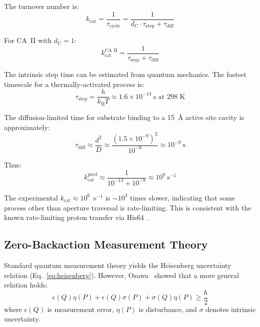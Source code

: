 \documentclass[twocolumn,amsmath,amssymb,aps,prb,superscriptaddress,longbibliography]{revtex4-2}
\newcommand{\dC}{d_{\mathrm{C}}}
\newcommand{\kcat}{k_{\mathrm{cat}}}
\newcommand{\kB}{k_{\mathrm{B}}}
\begin{document}
The turnover number is:
\begin{equation}
\kcat = \frac{1}{\tau_{\text{cycle}}} = \frac{1}{\dC \cdot \tau_{\text{step}} + \tau_{\text{diff}}}
\label{eq:kcat-full}
\end{equation}

For CA~II with $\dC = 1$:
\begin{equation}
\kcat^{\text{CA II}} = \frac{1}{\tau_{\text{step}} + \tau_{\text{diff}}}
\end{equation}

The intrinsic step time can be estimated from quantum mechanics. The fastest timescale for a thermally-activated process is:
\begin{equation}
\tau_{\text{step}} = \frac{h}{\kB T} \approx 1.6 \times 10^{-13}~\text{s at 298 K}
\label{eq:tau-step}
\end{equation}

The diffusion-limited time for substrate binding to a 15~\AA{} active site cavity is approximately:
\begin{equation}
\tau_{\text{diff}} \approx \frac{d^2}{D} \approx \frac{(1.5 \times 10^{-9})^2}{10^{-9}} \approx 10^{-9}~\text{s}
\end{equation}

Thus:
\begin{equation}
\kcat^{\text{pred}} \approx \frac{1}{10^{-13} + 10^{-9}} \approx 10^9~\text{s}^{-1}
\end{equation}

The experimental $\kcat \approx 10^6$~s$^{-1}$ is $\sim 10^3$ times slower, indicating that some process other than aperture traversal is rate-limiting. This is consistent with the known rate-limiting proton transfer via His64~\cite{Silverman1988, Maupin2009}.

\subsection{Zero-Backaction Measurement Theory}
\label{sec:zero-backaction-theory}

Standard quantum measurement theory yields the Heisenberg uncertainty relation (Eq.~\ref{eq:heisenberg}). However, Ozawa~\cite{Ozawa2003} showed that a more general relation holds:
\begin{equation}
\epsilon(Q)\eta(P) + \epsilon(Q)\sigma(P) + \sigma(Q)\eta(P) \geq \frac{\hbar}{2}
\label{eq:ozawa}
\end{equation}
where $\epsilon(Q)$ is measurement error, $\eta(P)$ is disturbance, and $\sigma$ denotes intrinsic uncertainty.
\end{document}
